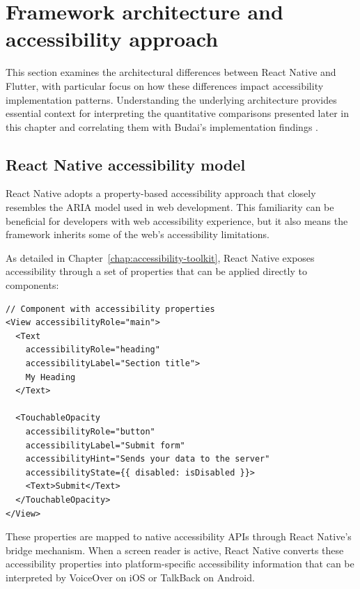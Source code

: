 \section{Framework architecture and accessibility approach}
\label{sec:framework-architecture}

This section examines the architectural differences between React Native and Flutter, with particular focus on how these differences impact accessibility implementation patterns. Understanding the underlying architecture provides essential context for interpreting the quantitative comparisons presented later in this chapter and correlating them with Budai's implementation findings \cite{budai2024mobile}.

\subsection{React Native accessibility model}
React Native adopts a property-based accessibility approach that closely resembles the ARIA model used in web development. This familiarity can be beneficial for developers with web accessibility experience, but it also means the framework inherits some of the web's accessibility limitations.

As detailed in Chapter~\ref{chap:accessibility-toolkit}, React Native exposes accessibility through a set of properties that can be applied directly to components:

\begin{lstlisting}[style=ReactNativeStyle, caption=React Native accessibility property model, label=lst:react-native-accessibility]
// Component with accessibility properties
<View accessibilityRole="main">
  <Text 
    accessibilityRole="heading" 
    accessibilityLabel="Section title">
    My Heading
  </Text>
  
  <TouchableOpacity
    accessibilityRole="button"
    accessibilityLabel="Submit form"
    accessibilityHint="Sends your data to the server"
    accessibilityState={{ disabled: isDisabled }}>
    <Text>Submit</Text>
  </TouchableOpacity>
</View>
\end{lstlisting}

\pagebreak

These properties are mapped to native accessibility APIs through React Native's bridge mechanism. When a screen reader is active, React Native converts these accessibility properties into platform-specific accessibility information that can be interpreted by VoiceOver on iOS or TalkBack on Android.

